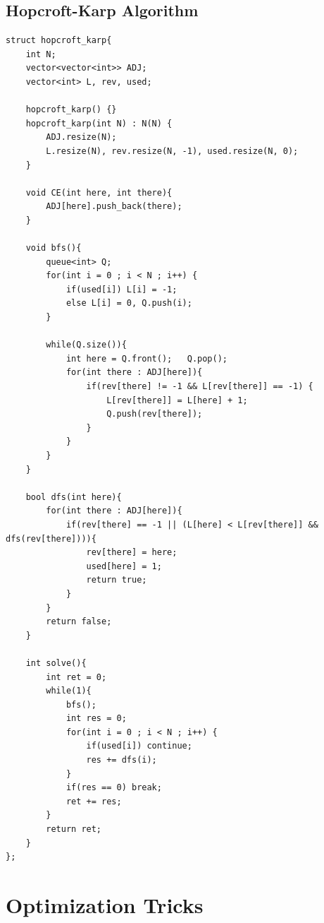 \documentclass[landscape, 8pt, a4paper, oneside, twocolumn]{extarticle}
\begin{document}
\subsection{Hopcroft-Karp Algorithm}
\begin{verbatim}
struct hopcroft_karp{
    int N;
    vector<vector<int>> ADJ;
    vector<int> L, rev, used;

    hopcroft_karp() {}
    hopcroft_karp(int N) : N(N) {
        ADJ.resize(N);  
        L.resize(N), rev.resize(N, -1), used.resize(N, 0);
    }

    void CE(int here, int there){
        ADJ[here].push_back(there);
    }

    void bfs(){
        queue<int> Q;
        for(int i = 0 ; i < N ; i++) {
            if(used[i]) L[i] = -1;
            else L[i] = 0, Q.push(i);
        }

        while(Q.size()){
            int here = Q.front();   Q.pop();
            for(int there : ADJ[here]){
                if(rev[there] != -1 && L[rev[there]] == -1) {
                    L[rev[there]] = L[here] + 1;
                    Q.push(rev[there]);
                }
            }
        }
    }

    bool dfs(int here){
        for(int there : ADJ[here]){
            if(rev[there] == -1 || (L[here] < L[rev[there]] && dfs(rev[there]))){
                rev[there] = here;
                used[here] = 1;
                return true;
            }
        }
        return false;
    }

    int solve(){
        int ret = 0;
        while(1){
            bfs();
            int res = 0;
            for(int i = 0 ; i < N ; i++) {
                if(used[i]) continue;
                res += dfs(i);
            }
            if(res == 0) break;
            ret += res;
        }
        return ret;
    }
};
\end{verbatim}

\section{Optimization Tricks}
\end{document}
